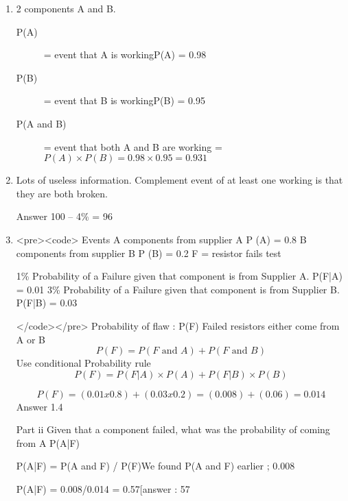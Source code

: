\documentclass[]{report}
\begin{document}
\begin{enumerate}
\item 
2 components A and B.
\begin{description}
\item[P(A)] = event that A is workingP(A) = 0.98
\item[P(B)] = event that B is workingP(B) = 0.95
\item[P(A and B)] = event that both A and B are working = $P(A) \times P(B) = 0.98 \times 0.95 = 0.931$
\end{description}

\item 
Lots of useless information.
Complement event of at least one working is that they are both broken.

Answer  100 – 4\% = 96%

\item 


<pre><code>
Events 
A components from supplier A  P (A) = 0.8 
B components from supplier B  P (B) = 0.2 
F = resistor fails test

1\% Probability of a Failure given that component is from Supplier A.      P(F|A) = 0.01
3\% Probability of a Failure given that component is from Supplier B.      P(F|B) = 0.03

</code></pre>
Probability of flaw : P(F)
Failed resistors either come from A or B
\[P( F) =  P ( F \mbox{ and } A)  +  P( F \mbox{ and } B)\]
Use conditional Probability  rule
\[P(F) = P(F|A)\times P(A)  + P(F|B)\times P(B)\]

\[P(F)  =  ( 0.01 x 0.8 ) + ( 0.03 x 0.2) = (0.008) + (0.06) = 0.014\]
Answer 1.4%


Part ii
Given that a component failed, what was the probability of coming from A
P(A|F) 

P(A|F) = P(A and F)  / P(F)We found P(A and F) earlier ; 0.008

P(A|F) = 0.008/0.014 =  0.57[answer : 57%




\end{enumerate}











\end{document}
